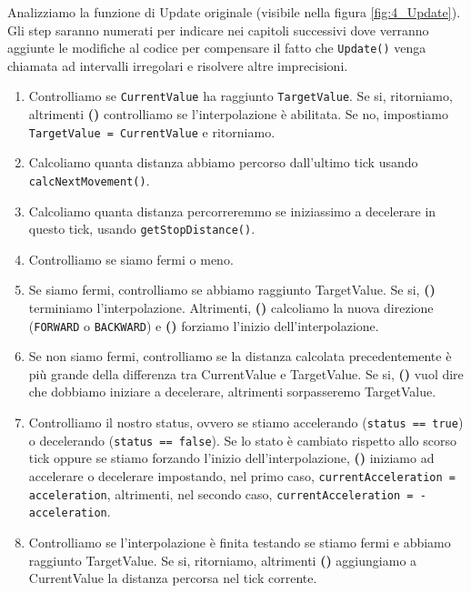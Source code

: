 \documentclass[main.tex]{subfiles}
\begin{document}
Analizziamo la funzione di Update originale (visibile nella figura \ref{fig:4_Update}). Gli step saranno numerati per indicare nei capitoli successivi dove verranno aggiunte le modifiche al codice per compensare il fatto che \lstinline{Update()} venga chiamata ad intervalli irregolari e risolvere altre imprecisioni.
\newcommand{\itemEnu}{\stepcounter{enumi}\textbf{(\number\numexpr\value{enumi}\relax) }}
\begin{enumerate}
    \item Controlliamo se \lstinline{CurrentValue} ha raggiunto \lstinline{TargetValue}. Se si, ritorniamo, altrimenti \itemEnu controlliamo se l'interpolazione è abilitata. Se no, impostiamo \lstinline{TargetValue = CurrentValue} e ritorniamo.
    \item Calcoliamo quanta distanza abbiamo percorso dall'ultimo tick usando \lstinline{calcNextMovement()}.
    \item Calcoliamo quanta distanza percorreremmo se iniziassimo a decelerare in questo tick, usando \lstinline{getStopDistance()}.
    \item Controlliamo se siamo fermi o meno.
    \item Se siamo fermi, controlliamo se abbiamo raggiunto TargetValue. Se si, \itemEnu terminiamo l'interpolazione. Altrimenti, \itemEnu calcoliamo la nuova direzione (\lstinline{FORWARD} o \lstinline{BACKWARD}) e \itemEnu forziamo l'inizio dell'interpolazione.
    \item Se non siamo fermi, controlliamo se la distanza calcolata precedentemente è più grande della differenza tra CurrentValue e TargetValue. Se si, \itemEnu vuol dire che dobbiamo iniziare a decelerare, altrimenti sorpasseremo TargetValue.
    \item Controlliamo il nostro status, ovvero se stiamo accelerando (\lstinline{status == true}) o decelerando (\lstinline{status == false}). Se lo stato è cambiato rispetto allo scorso tick oppure se stiamo forzando l'inizio dell'interpolazione, \itemEnu iniziamo ad accelerare o decelerare impostando, nel primo caso, \lstinline{currentAcceleration = acceleration}, altrimenti, nel secondo caso, \lstinline{currentAcceleration = -acceleration}.
    \item Controlliamo se l'interpolazione è finita testando se stiamo fermi e abbiamo raggiunto TargetValue. Se si, ritorniamo, altrimenti \itemEnu aggiungiamo a CurrentValue la distanza percorsa nel tick corrente.
\end{enumerate}
\end{document}
